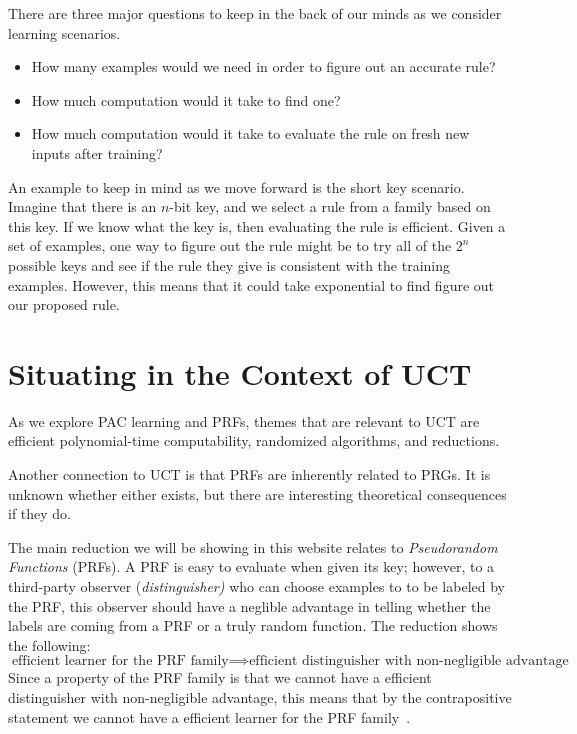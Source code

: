 \documentclass[11pt,fleqn]{article}
\begin{document}
There are three major questions to keep in the back of our minds as we consider learning scenarios.

\begin{itemize}
    \item How many examples would we need in order to figure out an accurate rule?
    \item How much computation would it take to find one?
    \item How much computation would it take to evaluate the rule on fresh new inputs after training?
\end{itemize}

An example to keep in mind as we move forward is the short key scenario. Imagine that there is an $n$-bit key, and we select a rule from a family based on this key. If we know what the key is, then evaluating the rule is efficient. Given a set of examples, one way to figure out the rule might be to try all of the $2^n$ possible keys and see if the rule they give is consistent with the training examples. However, this means that it could take exponential to find figure out our proposed rule.

\section{Situating in the Context of UCT}

As we explore PAC learning and PRFs, themes that are relevant to UCT are efficient polynomial-time computability, randomized algorithms, and reductions.

Another connection to UCT is that PRFs are inherently related to PRGs. It is unknown whether either exists, but there are interesting theoretical consequences if they do.

The main reduction we will be showing in this website relates to \textit{Pseudorandom Functions} (PRFs). A PRF is easy to evaluate when given its key; however, to a third-party observer (\textit{distinguisher)} who can choose examples to to be labeled by the PRF, this observer should have a neglible advantage in telling whether the labels are coming from a PRF or a truly random function. The reduction shows the following:
\[\text{efficient learner for the PRF family} \implies \text{efficient distinguisher with non-negligible advantage}\]
Since a property of the PRF family is that we cannot have a efficient distinguisher with non-negligible advantage, this means that by the contrapositive statement we cannot have a efficient learner for the PRF family~\cite{mit-prf}.
\end{document}
